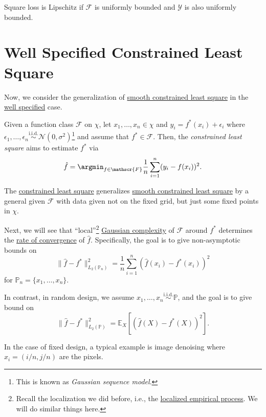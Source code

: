 \begin{eg}
	Square loss is Lipschitz if \(\mathscr{F} \) is uniformly bounded and \(\mathscr{Y} \) is also uniformly bounded.
\end{eg}

\section{Well Specified Constrained Least Square}
Now, we consider the generalization of \hyperref[prb:smooth-LS]{smooth constrained least square} in the \hyperref[def:well-specified]{well specified} case.

\begin{problem}\label{prb:constrained-LS}
Given a function class \(\mathscr{F} \) on \(\chi \), let \(x_1, \dots , x_n \in \chi \) and \(y_i = f^{\ast} (x_i) + \epsilon _i\) where \(\epsilon _1, \dots , \epsilon _n \overset{\text{i.i.d.} }{\sim } \mathcal{N} (0, \sigma ^2) \)\footnote{This is known as \emph{Gaussian sequence model}.} and assume that \(f^{\ast} \in \mathscr{F} \). Then, the \emph{constrained least square} aims to estimate \(f^{\ast} \) via
\[
	\hat{f} = \argmin_{f\in\mathscr{F} } \frac{1}{n} \sum_{i=1}^{n} (y_i - f(x_i))^2.
\]
\end{problem}

\begin{note}
	The \hyperref[prb:constrained-LS]{constrained least square} generalizes \hyperref[prb:smooth-LS]{smooth constrained least square} by a general given \(\mathscr{F} \) with data given not on the fixed grid, but just some fixed points in \(\chi \).
\end{note}

Next, we will see that ``local''\footnote{Recall the localization we did before, i.e., the \hyperref[def:localized-EP]{localized empirical process}. We will do similar things here.} \hyperref[def:Gaussian-width]{Gaussian complexity} of \(\mathscr{F} \) around \(f^{\ast} \) determines the \hyperref[def:rate-of-convergence]{rate of convergence} of \(\hat{f} \). Specifically, the goal is to give non-asymptotic bounds on
\[
	\lVert \hat{f} - f^{\ast} \rVert ^2 _{L_2(\mathbb{P} _n)}
	= \frac{1}{n} \sum_{i=1}^{n} \left( \hat{f} (x_i) - f^{\ast} (x_i) \right) ^2
\]
for \(\mathbb{P} _n = \{ x_1, \dots , x_n \} \).

\begin{note}
	In contrast, in random design, we assume \(x_1, \dots , x_n \overset{\text{i.i.d.} }{\sim } \mathbb{P} \), and the goal is to give bound on
	\[
		\lVert \hat{f} - f^{\ast} \rVert ^2_{L_2(\mathbb{P} )}
		= \mathbb{E}_{X}\left[(\hat{f} (X) - f^{\ast} (X))^2 \right] .
	\]
\end{note}

\begin{eg}
	In the case of fixed design, a typical example is image denoising where \(x_i = (i / n, j / n)\) are the pixels.
\end{eg}